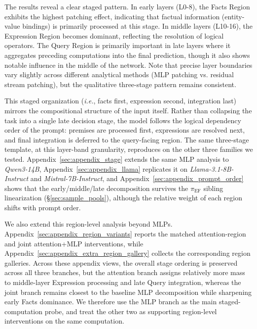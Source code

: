 \documentclass[11pt]{article}
\begin{document}
The results reveal a clear staged pattern. In early layers (L0-8), the Facts Region exhibits the highest patching effect, indicating that factual information (entity-value bindings) is primarily processed at this stage. In middle layers (L10-16), the Expression Region becomes dominant, reflecting the resolution of logical operators. The Query Region is primarily important in late layers where it aggregates preceding computations into the final prediction, though it also shows notable influence in the middle of the network. Note that precise layer boundaries vary slightly across different analytical methods (MLP patching vs. residual stream patching), but the qualitative three-stage pattern remains consistent.

This staged organization (\textit{i.e.}, facts first, expression second, integration last) mirrors the compositional structure of the input itself. Rather than collapsing the task into a single late decision stage, the model follows the logical dependency order of the prompt: premises are processed first, expressions are resolved next, and final integration is deferred to the query-facing region. The same three-stage template, at this layer-band granularity, reproduces on the other three families we tested. Appendix~\ref{sec:appendix_stage} extends the same MLP analysis to \textit{Qwen3-14B}, Appendix~\ref{sec:appendix_llama} replicates it on \textit{Llama-3.1-8B-Instruct} and \textit{Mistral-7B-Instruct}, and Appendix~\ref{sec:appendix_prompt_order} shows that the early/middle/late decomposition survives the $\pi_{\mathrm{EF}}$ sibling linearization (§\ref{sec:sample_pools}), although the relative weight of each region shifts with prompt order.

We also extend this region-level analysis beyond MLPs. Appendix~\ref{sec:appendix_region_variants} reports the matched attention-region and joint attention+MLP interventions, while Appendix~\ref{sec:appendix_extra_region_gallery} collects the corresponding region galleries. Across these appendix views, the overall stage ordering is preserved across all three branches, but the attention branch assigns relatively more mass to middle-layer Expression processing and late Query integration, whereas the joint branch remains closest to the baseline MLP decomposition while sharpening early Facts dominance. We therefore use the MLP branch as the main staged-computation probe, and treat the other two as supporting region-level interventions on the same computation.
\end{document}
